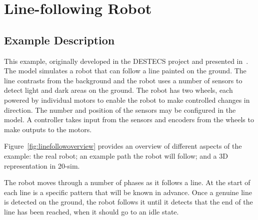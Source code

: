 \section{Line-following Robot}
\label{sec:linefollwerrobot}

\subsection{Example Description}

This example, originally developed in the DESTECS project and presented in~\cite{Ingram&12}. The model  simulates a robot that can follow a line painted on the ground. The line contrasts from the background and the robot uses a number of sensors to detect light and dark areas on the ground. The robot has two wheels, each powered by individual motors to enable the robot to make controlled changes in direction. The number and position of the sensors may be configured in the model. A controller takes input from the sensors and encoders from the wheels to make outputs to the motors. 

Figure~\ref{fig:linefollowoverview} provides an overview of different aspects of the example: the real robot; an example path the robot will follow; and a 3D representation in 20-sim. 

The robot moves through a number of phases as it follows a line. At the start of each line is a specific pattern that will be known in advance. Once a genuine line is detected on the ground, the robot follows it until it detects that the end of the line has been reached, when it should go to an idle state. 

